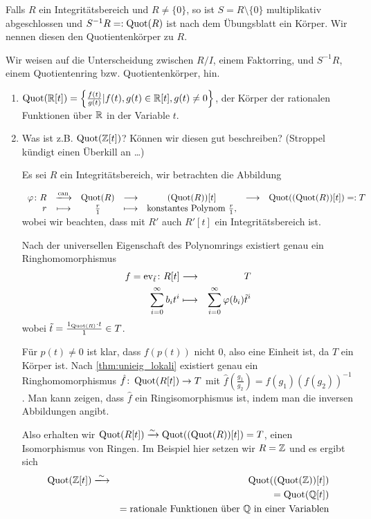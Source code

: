 \documentclass[12pt,a4paper]{scrartcl}
\begin{document}
\begin{defi}
	Falls $R$ ein Integritätsbereich und $R\neq\{0\}$, so ist $S = R\setminus\{0\}$ multiplikativ abgeschlossen und $S^{-1}R =: \operatorname{Quot}(R)$ ist nach dem Übungsblatt ein Körper. Wir nennen diesen den Quotientenkörper zu $R$.
\end{defi}
\begin{bem} Wir weisen auf die Unterscheidung zwischen $R/I$, einem Faktorring, und $S^{-1}R$, einem Quotientenring bzw. Quotientenkörper, hin.
\end{bem}
\begin{bsp}
	\leavevmode
	\begin{enumerate}
		\item $\operatorname{Quot}(\mathbb R[t]) = \left\{\frac{f(t)}{g(t)}| f(t), g(t)\in \mathbb R[t], g(t)\neq 0\right\}$, der Körper der rationalen Funktionen über $\mathbb R$ in der Variable $t$.
		
		\item Was ist z.B. $\operatorname{Quot}(\mathbb Z[t])$? Können wir diesen \glqq gut\grqq{} beschreiben? (Stroppel kündigt einen Überkill an \dots)
		
		Es sei $R$ ein Integritätsbereich, wir betrachten die Abbildung
		
		$\begin{array}{rcccccl}
			\phi\colon R & \xlongrightarrow{\can} & \Quot(R) &\longto& (\Quot(R))[t] &\longto& \Quot((\Quot(R))[t]) =: T\\
			r& \longmapsto & \frac r1 & \longmapsto & \text{konstantes Polynom } \frac r1,
		\end{array}$
		wobei wir beachten, dass mit $R'$ auch $R'[t]$ ein Integritätsbereich ist.
		
		Nach der universellen Eigenschaft des Polynomrings existiert genau ein Ringhomomorphismus
		\begin{eqnarray*}
			f = \operatorname{ev}_{\tilde{t}}\colon R[t] & \longrightarrow & T\\
			\sum_{i = 0}^{\infty} b_it^i & \longmapsto & \sum_{i = 0}^{\infty}\varphi(b_i)\tilde{t}^i
		\end{eqnarray*}
		wobei $\tilde{t} = \frac{1_{\operatorname{Quot}(R)}\cdot t}{1} \in T$.
		
		Für $p(t)\neq 0$ ist klar, dass $f(p(t))$ nicht $0$, also eine Einheit ist, da $T$ ein Körper ist. Nach \cref{thm:unieig_lokali} existiert genau ein Ringhomomorphismus $\hat{f}\colon \operatorname{Quot}(R[t])\to T$ mit $\hat{f}\left(\frac{g_1}{g_2}\right) = f(g_1)(f(g_2))^{-1}$. Man kann zeigen, dass $\hat{f}$ ein Ringisomorphismus ist, indem man die inversen Abbildungen angibt.
		
		Also erhalten wir $\operatorname{Quot}(R[t])\xrightarrow{\sim} \operatorname{Quot}((\operatorname{Quot}(R))[t]) = T$, einen Isomorphismus von Ringen. Im Beispiel hier setzen wir $R = \mathbb Z$ und es ergibt sich
		\begin{eqnarray*}
			\Quot(\IZ[t]) & \xlongrightarrow{\sim} & \Quot((\Quot(\IZ))[t])\\
			& &= \Quot(\IQ[t])\\
			&& = \text{rationale Funktionen über $\IQ$ in einer Variablen}
		\end{eqnarray*}
	\end{enumerate}
\end{bsp}
\end{document}
